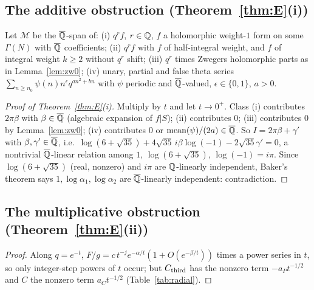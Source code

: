 \subsection{The additive obstruction (Theorem~\ref{thm:E}(i))}
Let $\mathcal M$ be the $\overline{\mathbb{Q}}$-span of: (i) $q^rf$, $r\in\mathbb{Q}$, $f$ a holomorphic weight-$1$ form on some $\Gamma(N)$ with $\overline{\mathbb{Q}}$
coefficients; (ii) $q^rf$ with $f$ of half-integral weight, and $f$ of integral weight $k\ge2$ without $q^r$ shift; (iii) $q^r$ times
Zwegers holomorphic parts as in Lemma~\ref{lem:zw0}; (iv) unary, partial and false theta series
$\sum_{n\ge n_0}\psi(n)n^\epsilon q^{an^2+bn}$ with $\psi$ periodic and $\overline{\mathbb{Q}}$-valued, $\epsilon\in\{0,1\}$, $a>0$.
\begin{proof}[Proof of Theorem~\ref{thm:E}(i)]
Multiply by $t$ and let $t\to0^+$. Class (i) contributes $2\pi\beta$ with $\beta\in\overline{\mathbb{Q}}$ (algebraic expansion of $f|S$); (ii) contributes $0$;
(iii) contributes $0$ by Lemma~\ref{lem:zw0}; (iv) contributes $0$ or $\mathrm{mean}(\psi)/(2a)\in\overline{\mathbb{Q}}$. So $I=2\pi\beta+\gamma'$ with
$\beta,\gamma'\in\overline{\mathbb{Q}}$, i.e.\ $\log(6+\sqrt{35})+4\sqrt{35}\,i\beta\log(-1)-2\sqrt{35}\gamma'=0$, a nontrivial $\overline{\mathbb{Q}}$-linear relation
among $1$, $\log(6+\sqrt{35})$, $\log(-1)=i\pi$. Since $\log(6+\sqrt{35})$ (real, nonzero) and $i\pi$ are $\mathbb{Q}$-linearly independent,
Baker's theorem \cite{Baker} says $1,\log\alpha_1,\log\alpha_2$ are $\overline{\mathbb{Q}}$-linearly independent: contradiction.
\end{proof}

\subsection{The multiplicative obstruction (Theorem~\ref{thm:E}(ii))}
\begin{proof}
Along $q=e^{-t}$, $F/g=c\,t^{-j}e^{-\alpha/t}(1+O(e^{-\beta/t}))$ times a power series in $t$, so only integer-step powers of $t$ occur;
but $C_{\mathrm{third}}$ has the nonzero term $-a_Pt^{-1/2}$ and $C$ the nonzero term $a_Ct^{-1/2}$ (Table~\ref{tab:radial}).
\end{proof}

